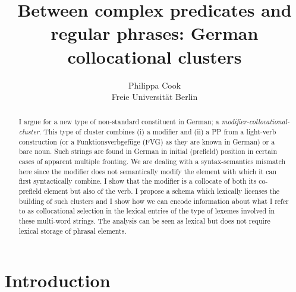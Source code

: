\documentclass[11pt,a4paper,fleqn]{article}
\title{Between complex predicates and regular phrases: German collocational clusters}
\author{Philippa Cook\\
Freie Universit{\"a}t Berlin}
\begin{document}
\begin{abstract}
I argue for a new type of non-standard constituent in German; a \textit{modifier-collocational-cluster}. This type of cluster combines (i) a modifier and (ii) a
PP from a light-verb construction (or a Funktionsverbgefüge (FVG) as they are known in German) or a bare noun. Such strings are found in German in initial
(prefield) position in certain cases of apparent multiple fronting. We are dealing with a syntax-semantics mismatch here since the modifier does not semantically modify the element with which it can first syntactically combine. I show that the modifier is a collocate of both its co-prefield element but also of the verb. I propose a schema which lexically licenses the building of such clusters and I show how we can encode information about what I refer to as collocational selection
in the lexical entries of the type of lexemes involved in these multi-word strings. The analysis can be seen as lexical but does not require lexical storage
of phrasal elements.

\end{abstract}

\setcounter{footnote}{2}
\renewcommand{\thefootnote}{\fnsymbol{footnote}}
\renewcommand{\thefootnote}{\arabic{footnote}}
\setcounter{footnote}{0}


\section{Introduction}
\end{document}
